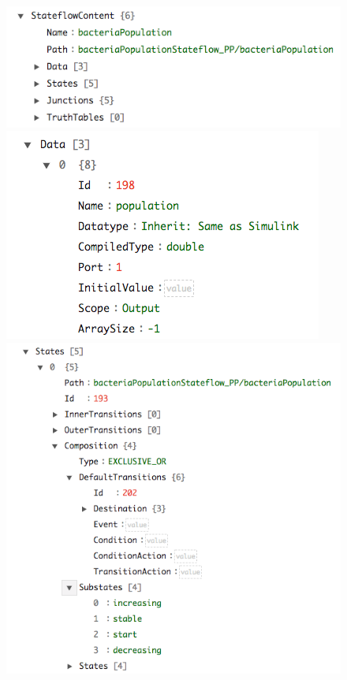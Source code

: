 \documentclass{article}
\begin{document}
\begin{figure}[h]
\begin{center}
\includegraphics[scale=0.4]{figures/stateflow_json}
\includegraphics[scale=0.4]{figures/data}
\includegraphics[scale=0.35]{figures/state}

\end{center}
\end{figure}
\end{document}
